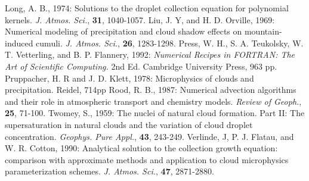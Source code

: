 \por
Long, A. B., 1974: Solutions to the droplet collection equation for polynomial
        kernels.
        {\it J. Atmos. Sci.},
        {\bf 31},
        1040-1057.
\por
Liu, J. Y, and H. D. Orville, 1969: Numerical modeling of precipitation and cloud
shadow effects on mountain-induced cumuli. {\it J. Atmos. Sci.}, {\bf 26},
1283-1298.
\por
Press, W. H., S. A. Teukolsky, W. T. Vetterling, and B. P. Flannery, 1992:
        {\it Numerical Recipes in FORTRAN: The Art of Scientific Computing.}
        2nd Ed.
        Cambridge University Press,
        963 pp.
\por
Pruppacher, H. R and J. D. Klett, 1978: Microphysics of clouds and precipitation.
Reidel, 714pp
\por
Rood, R. B., 1987: Numerical advection algorithms and their role in atmospheric
transport and chemistry models. {\it Review of Geoph.}, {\bf 25}, 71-100.
\por
Twomey, S., 1959: The nuclei of natural cloud formation. Part II: The
        supersaturation in natural clouds and the variation of cloud droplet
        concentration.
        {\it Geophys. Pure Appl.},
        {\bf 43},
        243-249.
\por
Verlinde, J, P. J. Flatau, and W. R. Cotton, 1990:
        Analytical solution to the collection growth equation: comparison with
        approximate methods and application to cloud microphysics
        parameterization schemes.
        {\it J. Atmos. Sci.},
        {\bf 47},
        2871-2880.
